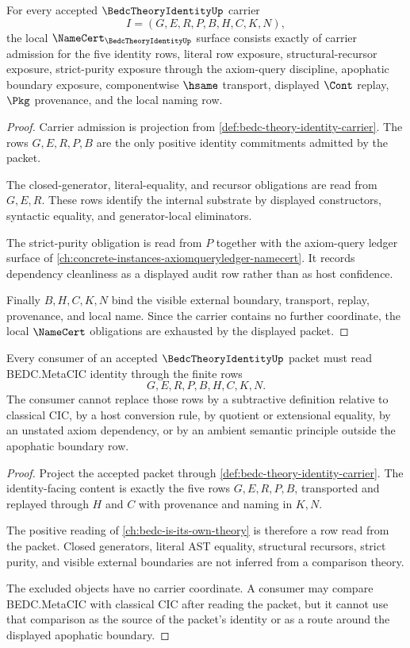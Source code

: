 \begin{theorem}
\label{thm:bedc-theory-identity-namecert-obligations}
For every accepted $\BedcTheoryIdentityUp$ carrier
$$
I=(G,E,R,P,B,H,C,K,N),
$$
the local $\NameCert_{\BedcTheoryIdentityUp}$ surface consists exactly of carrier admission for the five identity rows, literal row exposure, structural-recursor exposure, strict-purity exposure through the axiom-query discipline, apophatic boundary exposure, componentwise $\hsame$ transport, displayed $\Cont$ replay, $\Pkg$ provenance, and the local naming row.
\end{theorem}
\begin{proof}
Carrier admission is projection from \autoref{def:bedc-theory-identity-carrier}. The rows $G,E,R,P,B$ are the only positive identity commitments admitted by the packet.

The closed-generator, literal-equality, and recursor obligations are read from $G,E,R$. These rows identify the internal substrate by displayed constructors, syntactic equality, and generator-local eliminators.

The strict-purity obligation is read from $P$ together with the axiom-query ledger surface of \autoref{ch:concrete-instances-axiomqueryledger-namecert}. It records dependency cleanliness as a displayed audit row rather than as host confidence.

Finally $B,H,C,K,N$ bind the visible external boundary, transport, replay, provenance, and local name. Since the carrier contains no further coordinate, the local $\NameCert$ obligations are exhausted by the displayed packet.
\end{proof}

\begin{theorem}
\label{thm:bedc-theory-identity-boundary-nonescape}
Every consumer of an accepted $\BedcTheoryIdentityUp$ packet must read BEDC.MetaCIC identity through the finite rows
$$
G,E,R,P,B,H,C,K,N.
$$
The consumer cannot replace those rows by a subtractive definition relative to classical CIC, by a host conversion rule, by quotient or extensional equality, by an unstated axiom dependency, or by an ambient semantic principle outside the apophatic boundary row.
\end{theorem}
\begin{proof}
Project the accepted packet through \autoref{def:bedc-theory-identity-carrier}. The identity-facing content is exactly the five rows $G,E,R,P,B$, transported and replayed through $H$ and $C$ with provenance and naming in $K,N$.

The positive reading of \autoref{ch:bedc-is-its-own-theory} is therefore a row read from the packet. Closed generators, literal AST equality, structural recursors, strict purity, and visible external boundaries are not inferred from a comparison theory.

The excluded objects have no carrier coordinate. A consumer may compare BEDC.MetaCIC with classical CIC after reading the packet, but it cannot use that comparison as the source of the packet's identity or as a route around the displayed apophatic boundary.
\end{proof}

